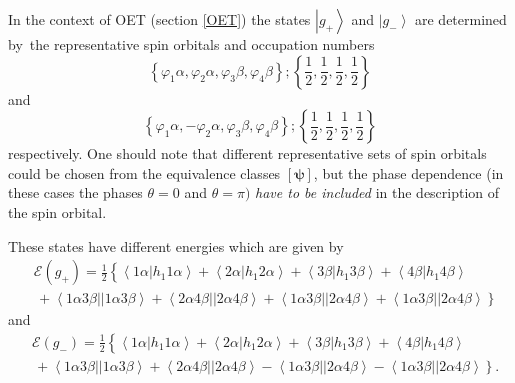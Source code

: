 \documentclass[aps,preprint]{revtex4}%
\begin{document}
In the context of OET (section \ref{OET}) the states $\left\vert
g_{+}\right\rangle $ and $\left\vert g_{-}\right\rangle $ are determined
by\ the representative spin orbitals and occupation numbers
\begin{equation}
\left\{  \varphi_{1}\alpha,\varphi_{2}\alpha,\varphi_{3}\beta,\varphi_{4}%
\beta\right\}  ;\left\{  \frac{1}{2},\frac{1}{2},\frac{1}{2},\frac{1}%
{2}\right\}
\end{equation}
and%
\begin{equation}
\left\{  \varphi_{1}\alpha,-\varphi_{2}\alpha,\varphi_{3}\beta,\varphi
_{4}\beta\right\}  ;\left\{  \frac{1}{2},\frac{1}{2},\frac{1}{2},\frac{1}%
{2}\right\}
\end{equation}
respectively. One should note that different representative sets of spin
orbitals could be chosen from the equivalence classes $\left[
\boldsymbol{\psi}\right]  $, but the phase dependence (in these cases the
phases $\theta=0$ and $\theta=\pi)$ \emph{have to be included} in the
description of the spin orbital.

These states have different energies which are given by
\begin{align}
&  \mathcal{E}\left(  g_{+}\right)  =\frac{1}{2}\left\{  \overset
{}{\left\langle 1\alpha\left\vert h_{1}1\alpha\right.  \right\rangle
+\left\langle 2\alpha\left\vert h_{1}2\alpha\right.  \right\rangle
+\left\langle 3\beta\left\vert h_{1}3\beta\right.  \right\rangle +\left\langle
4\beta\left\vert h_{1}4\beta\right.  \right\rangle }\right. \nonumber\\
&  \left.  \,+\left\langle 1\alpha3\beta\right\vert \left\vert 1\alpha
3\beta\right\rangle +\left\langle 2\alpha4\beta\right\vert \left\vert
2\alpha4\beta\right\rangle +\left\langle 1\alpha3\beta\right\vert \left\vert
2\alpha4\beta\right\rangle +\left\langle 1\alpha3\beta\right\vert \left\vert
2\alpha4\beta\right\rangle \overset{}{}\right\}  \label{E+}%
\end{align}
and
\begin{align}
&  \mathcal{E}\left(  g_{-}\right)  =\frac{1}{2}\left\{  \overset
{}{\left\langle 1\alpha\left\vert h_{1}1\alpha\right.  \right\rangle
+\left\langle 2\alpha\left\vert h_{1}2\alpha\right.  \right\rangle
+\left\langle 3\beta\left\vert h_{1}3\beta\right.  \right\rangle +\left\langle
4\beta\left\vert h_{1}4\beta\right.  \right\rangle }\right. \nonumber\\
&  \left.  \,+\left\langle 1\alpha3\beta\right\vert \left\vert 1\alpha
3\beta\right\rangle +\left\langle 2\alpha4\beta\right\vert \left\vert
2\alpha4\beta\right\rangle -\left\langle 1\alpha3\beta\right\vert \left\vert
2\alpha4\beta\right\rangle -\left\langle 1\alpha3\beta\right\vert \left\vert
2\alpha4\beta\right\rangle \overset{}{}\right\}  . \label{E-}%
\end{align}
\end{document}
